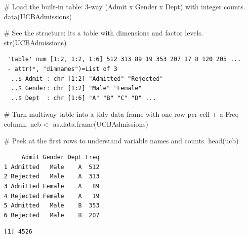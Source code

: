 \documentclass[
  letterpaper,
  DIV=11,
  numbers=noendperiod]{scrreprt}
\newenvironment{Shaded}{\begin{snugshade}}{\end{snugshade}}
\newcommand{\CommentTok}[1]{\textcolor[rgb]{0.37,0.37,0.37}{#1}}
\newcommand{\FunctionTok}[1]{\textcolor[rgb]{0.28,0.35,0.67}{#1}}
\newcommand{\NormalTok}[1]{\textcolor[rgb]{0.00,0.23,0.31}{#1}}
\newcommand{\OtherTok}[1]{\textcolor[rgb]{0.00,0.23,0.31}{#1}}
\newcommand{\SpecialCharTok}[1]{\textcolor[rgb]{0.37,0.37,0.37}{#1}}
\begin{document}
\begin{Shaded}
\begin{Highlighting}[]
\CommentTok{\# Load the built{-}in table: 3{-}way (Admit x Gender x Dept) with integer counts.}
\FunctionTok{data}\NormalTok{(UCBAdmissions)}

\CommentTok{\# See the structure: it\textquotesingle{}s a \textquotesingle{}table\textquotesingle{} with dimensions and factor levels.}
\FunctionTok{str}\NormalTok{(UCBAdmissions)}
\end{Highlighting}
\end{Shaded}

\begin{verbatim}
 'table' num [1:2, 1:2, 1:6] 512 313 89 19 353 207 17 8 120 205 ...
 - attr(*, "dimnames")=List of 3
  ..$ Admit : chr [1:2] "Admitted" "Rejected"
  ..$ Gender: chr [1:2] "Male" "Female"
  ..$ Dept  : chr [1:6] "A" "B" "C" "D" ...
\end{verbatim}

\begin{Shaded}
\begin{Highlighting}[]
\CommentTok{\# Turn multiway table into a tidy data frame with one row per cell + a \textquotesingle{}Freq\textquotesingle{} column.}
\NormalTok{ucb }\OtherTok{\textless{}{-}} \FunctionTok{as.data.frame}\NormalTok{(UCBAdmissions)}

\CommentTok{\# Peek at the first rows to understand variable names and counts.}
\FunctionTok{head}\NormalTok{(ucb)}
\end{Highlighting}
\end{Shaded}

\begin{verbatim}
     Admit Gender Dept Freq
1 Admitted   Male    A  512
2 Rejected   Male    A  313
3 Admitted Female    A   89
4 Rejected Female    A   19
5 Admitted   Male    B  353
6 Rejected   Male    B  207
\end{verbatim}

\begin{Shaded}
\end{Shaded}

\begin{verbatim}
[1] 4526
\end{verbatim}
\end{document}
